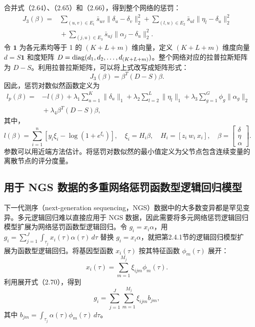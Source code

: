 合并式（2.64）、（2.65）和（2.66），得到整个网络的惩罚：
\begin{equation}
\begin{aligned}
J_3(\beta)={}&
\sum_{(u,v)\in E_1}\bar s_{uv}\lVert\delta_u-\delta_v\rVert_2^2
+\sum_{(l,u)\in E_2}\bar s_{ul}\lVert\eta_l-\delta_u\rVert_2^2\\
&{}+\sum_{(j,u)\in E_3}\bar s_{uj}\lVert\alpha_j-\delta_u\rVert_2^2.
\end{aligned}\tag{2.67}
\end{equation}
令 $\mathbf1$ 为各元素均等于 1 的 $(K+L+m)$ 维向量，定义 $(K+L+m)$ 维度向量 $d=S\mathbf1$ 和度矩阵 $D=\operatorname{diag}(d_1,d_2,\ldots,d_{(K+L+m)})$。整个网络对应的拉普拉斯矩阵为 $D-S$。利用拉普拉斯矩阵，可以将上式改写成矩阵形式：
\begin{equation}
J_3(\beta)=\beta^T(D-S)\beta.
\tag{2.68}
\end{equation}
因此，惩罚对数似然函数定义为
\begin{equation}
\begin{aligned}
l_p(\beta)={}&-l(\beta)
+\lambda_1\sum_{u=1}^{K}\lVert\delta_u\rVert_1
+\lambda_2\sum_{l=2}^{L}\lVert\eta_l\rVert_1
+\lambda_3\sum_{g=1}^{G}\phi_g\lVert\alpha_g\rVert_2\\
&{}+\lambda_4\beta^T(D-S)\beta,
\end{aligned}\tag{2.69}
\end{equation}
其中，
\[
l(\beta)=\sum_{i=1}^{n}[y_i\xi_i-\log(1+e^{\xi_i})],
\quad\xi_i=H_i\beta,\quad H_i=[z_i\ w_i\ x_i],
\quad\beta=\begin{bmatrix}\delta\\\eta\\\alpha\end{bmatrix}.
\]
参数可以用近端方法估计。将惩罚对数似然的最小值定义为父节点包含连续变量的离散节点的评分度量。

\subsection{用于 NGS 数据的多重网络惩罚函数型逻辑回归模型}

下一代测序（next-generation sequencing，NGS）数据中的大多数变异都是罕见变异。多元逻辑回归难以直接应用于 NGS 数据，因此需要将多元网络惩罚逻辑回归模型扩展为网络惩罚函数型逻辑回归。令 $g_i=x_i\alpha$，用 $g_i=\sum_{j=1}^{J}\int_{\tau_j}x_i(\tau)\alpha(\tau)\,d\tau$ 替换 $g_i=x_i\alpha$，就把第2.4.1节的逻辑回归模型扩展为函数型逻辑回归。将基因型函数 $x_i(\tau)$ 按其特征函数 $\phi_m(\tau)$ 展开：
\begin{equation}
x_i(\tau)=\sum_{m=1}^{M_j}\xi_{ijm}\phi_m(\tau).
\tag{2.70}
\end{equation}
利用展开式（2.70），得到
\begin{equation}
g_i=\sum_{j=1}^{J}\sum_{m=1}^{M_j}\xi_{ijm}b_{jm},
\tag{2.71}
\end{equation}
其中 $b_{jm}=\int_{\tau_j}\alpha(\tau)\phi_m(\tau)\,d\tau$。

